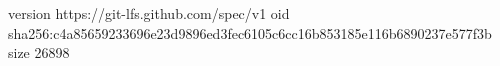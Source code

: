 version https://git-lfs.github.com/spec/v1
oid sha256:c4a85659233696e23d9896ed3fec6105c6cc16b853185e116b6890237e577f3b
size 26898
